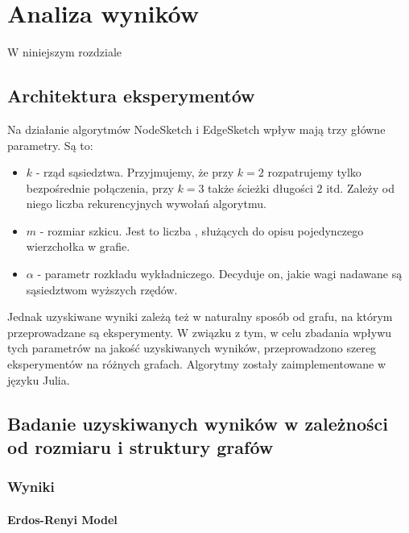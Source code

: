 \chapter{Analiza wyników}

    W niniejszym rozdziale 

\section{Architektura eksperymentów}

    Na działanie algorytmów NodeSketch i EdgeSketch wpływ mają trzy główne parametry. Są to:
    \begin{itemize}
        \item $k$ - rząd sąsiedztwa. Przyjmujemy, że przy $k = 2$ rozpatrujemy tylko bezpośrednie połączenia, przy $k = 3$ także ścieżki długości $2$ itd. Zależy od niego liczba rekurencyjnych wywołań algorytmu.
        \item $m$ - rozmiar szkicu. Jest to liczba , służących do opisu pojedynczego wierzchołka w grafie. 
        \item $\alpha$ - parametr rozkładu wykładniczego. Decyduje on, jakie wagi nadawane są sąsiedztwom wyższych rzędów.
    \end{itemize}

    Jednak uzyskiwane wyniki zależą też w naturalny sposób od grafu, na którym przeprowadzane są eksperymenty. W związku z tym, w celu zbadania wpływu tych parametrów na jakość uzyskiwanych wyników, przeprowadzono szereg eksperymentów na różnych grafach. Algorytmy zostały zaimplementowane w języku Julia.

\section{Badanie uzyskiwanych wyników w zależności od rozmiaru i struktury grafów}
    \subsection{Wyniki}
    \subsubsection{Erdos-Renyi Model}

